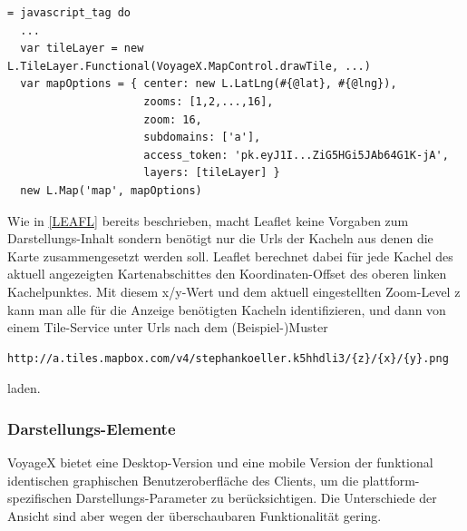 \lstset{language=JavaScript}
\begin{lstlisting}[frame=single,xleftmargin=0pt,caption={Initialisierung der Karte in einer Haml-Datei},captionpos=b]
= javascript_tag do
  ...
  var tileLayer = new L.TileLayer.Functional(VoyageX.MapControl.drawTile, ...)
  var mapOptions = { center: new L.LatLng(#{@lat}, #{@lng}),
   				   	 zooms: [1,2,...,16],
   				   	 zoom: 16,
   				   	 subdomains: ['a'],
   				   	 access_token: 'pk.eyJ1I...ZiG5HGi5JAb64G1K-jA',
   				   	 layers: [tileLayer] }
  new L.Map('map', mapOptions)
\end{lstlisting} \vspace{0.8cm}

\noindent Wie in \ref{LEAFL} bereits beschrieben, macht Leaflet keine Vorgaben zum Darstellungs-Inhalt sondern benötigt nur die Urls der Kacheln aus denen die Karte zusammengesetzt werden soll. Leaflet berechnet dabei für jede Kachel des aktuell angezeigten Kartenabschittes den Koordinaten-Offset des oberen linken Kachelpunktes. Mit diesem x/y-Wert und dem aktuell eingestellten Zoom-Level z kann man alle für die Anzeige benötigten Kacheln identifizieren, und dann von einem Tile-Service unter Urls nach dem (Beispiel-)Muster 
\lstset{language=JavaScript}
\begin{lstlisting}[frame=single,numbers=none,xleftmargin=0pt]
http://a.tiles.mapbox.com/v4/stephankoeller.k5hhdli3/{z}/{x}/{y}.png
\end{lstlisting}%
laden.\\

\subsubsection{Darstellungs-Elemente}
VoyageX bietet eine Desktop-Version und eine mobile Version der funktional identischen graphischen Benutzeroberfläche des Clients, um die plattform-spezifischen Darstellungs-Parameter zu berücksichtigen.
Die Unterschiede  der Ansicht sind aber wegen der überschaubaren Funktionalität gering.

